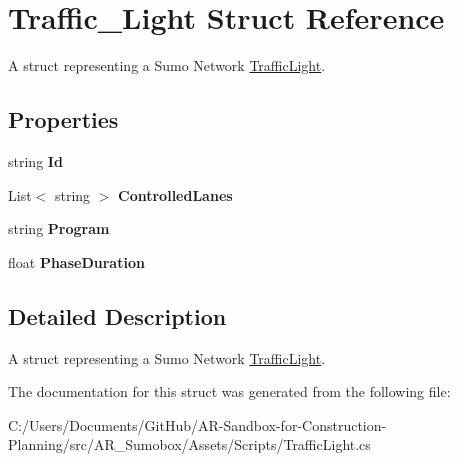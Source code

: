 \hypertarget{struct_traffic___light}{}\section{Traffic\+\_\+\+Light Struct Reference}
\label{struct_traffic___light}


A struct representing a Sumo Network \mbox{\hyperlink{class_traffic_light}{Traffic\+Light}}.  


\subsection*{Properties}
\begin{DoxyCompactItemize}
\item 
\mbox{\label{struct_traffic___light_a70986c94c03dba485c392ffbacadb047}} 
string {\bfseries Id}
\item 
\mbox{\label{struct_traffic___light_a3fc01edb8f6ed93d531302f98987e297}} 
List$<$ string $>$ {\bfseries Controlled\+Lanes}
\item 
\mbox{\label{struct_traffic___light_a3d8d35d950b2fc94a732b18cd80b284d}} 
string {\bfseries Program}
\item 
\mbox{\label{struct_traffic___light_a9baf7907f6c1856bf695b4e9d640fdb6}} 
float {\bfseries Phase\+Duration}
\end{DoxyCompactItemize}


\subsection{Detailed Description}
A struct representing a Sumo Network \mbox{\hyperlink{class_traffic_light}{Traffic\+Light}}. 



The documentation for this struct was generated from the following file\+:\begin{DoxyCompactItemize}
\item 
C\+:/\+Users/\+Documents/\+Git\+Hub/\+A\+R-\/\+Sandbox-\/for-\/\+Construction-\/\+Planning/src/\+A\+R\+\_\+\+Sumobox/\+Assets/\+Scripts/Traffic\+Light.\+cs\end{DoxyCompactItemize}
